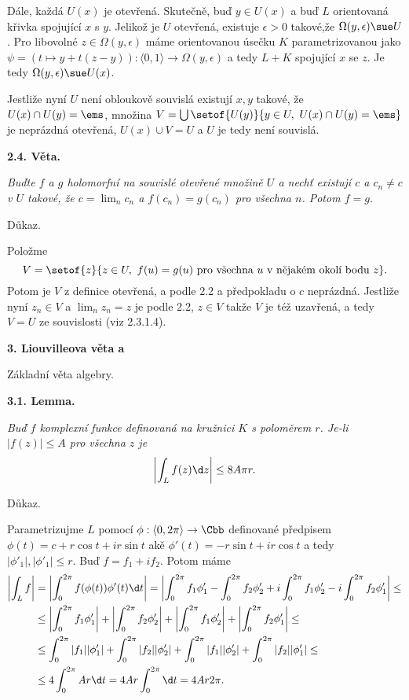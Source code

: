 \documentclass[12pt]{article}
\begin{document}
Dále, každá $U(x)$ je otevřená. Skutečně, buď $y\in U(x)$ a buď $L$ orientovaná křivka spojující $x$ s $y$. Jelikož je $U$ otevřená, existuje $\epsilon>0$ takové,že $\Omega(y,\epsilon)\sue U$. Pro libovolné $z\in
\Omega(y,\epsilon)$ máme orientovanou úsečku $K$ parametrizovanou jako
$\psi=(t\mapsto y+t(z-y)):\langle 0,1\rangle\to\Omega(y,\epsilon)$ a tedy
$L+K$ spojující $x$ se $z$. Je tedy $\Omega(y,\epsilon)\sue U(x)$.

Jestliže nyní $U$ není obloukově souvislá existují $x,y$ takové, že $U(x)\cap U(y)=\ems$,
 množina $V=\bigcup\setof{U(y)}{y\in U,\ U(x)\cap U(y)=\ems}$ je neprázdná otevřená, $U(x)\cup V=U$ a $U$ je tedy není souvislá.
 \sq

\bigskip

{\bf 2.4. Věta.} {\em Buďte $f$ a $g$ holomorfní na souvislé otevřené množině $U$ a nechť existují $c$ a $c_n\neq c$ v $U$ takové, že $c=\lim_n c_n$ a $f(c_n)=g(c_n)$ pro všechna $n$. Potom $f=g$.

Důkaz.} Položme
$$
V=\setof{z}{z\in U, \ f(u)=g(u)\ \text{pro všechna}\ u\ \text{v nějakém okolí bodu}\ z}.
 $$
Potom je  $V$ z definice otevřená, a podle 2.2 a předpokladu o $c$ neprázdná. Jestliže nyní $z_n\in V$ a $\lim_n z_n=z$ je podle 2.2, $z\in V$ takže
$V$ je též uzavřená, a tedy $V=U$ ze souvislosti (viz 2.3.1.4).\sq


\vskip10mm
 
 {\large\bf 3. Liouvilleova věta a 

\medskip

\hskip7mm  Základní věta algebry.}
 
 \bigskip
 
 {\bf 3.1. Lemma.} {\em Buď $f$ komplexní funkce definovaná na kružnici $
K$ s poloměrem $r$. Je-li $|f(z)|\leq A$ pro všechna $z$ je
 $$
 \left|\int_Lf(z)\d z\right|\leq 8A\pi r.
 $$
 
 Důkaz.} Parametrizujme $L$ pomocí $\phi:\langle 0,2\pi\rangle\to\Cbb$
definované předpisem $\phi(t)=c+r\cos t+ir\sin t$ ak\v e $\phi'(t)=-r\sin t+ ir\cos t$
a tedy $|\phi'_1|,|\phi'_1|\leq r$. Buď $f=f_1+if_2$. Potom máme
 $$
 \begin{aligned}
 \left|\int_Lf\right|&=\left|\int_0^{2\pi}f(\phi(t))\phi'(t)\d t\right|=
 \left|\int_0^{2\pi}f_1\phi'_1-\int_0^{2\pi}f_2\phi'_2+i\int_0^{2\pi}f_1\phi'_2-i\int_0^{2\pi}f_2\phi'_1\right|\leq\\
  &\leq\left|\int_0^{2\pi}f_1\phi'_1\right|+\left|\int_0^{2\pi}f_2\phi'_2\right|+\left|\int_0^{2\pi}f_1\phi'_2\right|+\left|\int_0^{2\pi}f_2\phi'_1
  \right|\leq\\
  &\leq
   \int_0^{2\pi}|f_1||\phi'_1|+\int_0^{2\pi}|f_2||\phi'_2|+\int_0^{2\pi}|f_1||\phi'_2|+\int_0^{2\pi}|f_2||\phi'_1|\leq\\
   &\leq 4\int_0^{2\pi}Ar\d t
 =4Ar\int_0^{2\pi}\d t=4Ar2\pi.
 \end{aligned}
 $$
 \sq
\end{document}
